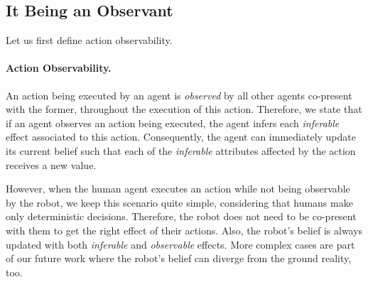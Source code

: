 \documentclass[letterpaper]{article} %
\begin{document}
\subsection{It Being an Observant}
Let us first define action observability.

\paragraph{Action Observability.}
An action being executed by an agent is \textit{observed} by all other agents co-present with the former, throughout the execution of this action.
Therefore, we state that if an agent observes an action being executed, 
the agent infers each \textit{inferable} effect associated to this action.
Consequently, the agent can immediately update its current belief such that each of the \textit{inferable} attributes affected by the action receives a new value.  



However, when the human agent executes an action while not being observable by the robot, we keep this scenario quite simple, considering that humans make only deterministic decisions. 
Therefore, the robot does not need to be co-present with them to get the right effect of their actions. Also, the robot's belief is always updated with both \textit{inferable} and \textit{observable} effects. More complex cases are part of our future work where the robot's belief can diverge from the ground reality, too. 
\end{document}
